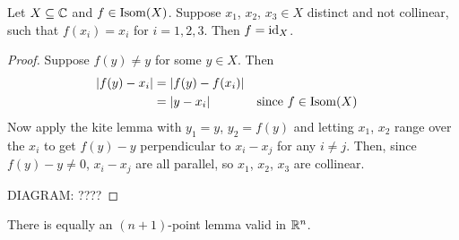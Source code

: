 \documentclass{../../template/note}
\begin{document}
    \begin{lemma}
        Let \(X \subseteq \mathbb C\) and \(f \in \operatorname{Isom}(X)\). Suppose \(x_1\), \(x_2\), \(x_3 \in X\) distinct and not collinear, such that \(f(x_i) = x_i\) for \(i=1,2,3\). Then \(f = \operatorname{id}_X\).
    \end{lemma}
    
    \begin{proof}
        Suppose \(f(y) \neq y\) for some \(y \in X\). Then
        \begin{align*}
            |f(y) - x_i| &= |f(y) - f(x_i)| \\
            &= |y - x_i| && \text{since } f \in \operatorname{Isom}(X)
        \end{align*}
        Now apply the kite lemma with \(y_1 = y\), \(y_2 = f(y)\) and letting \(x_1\), \(x_2\) range over the \(x_i\) to get \(f(y) - y\) perpendicular to \(x_i - x_j\) for any \(i \neq j\). Then, since \(f(y)-y \neq 0\),  \(x_i - x_j\) are all parallel, so \(x_1\), \(x_2\), \(x_3\) are collinear.

        DIAGRAM: ????
        
    \end{proof}
    
    \begin{remark*}
        There is equally an \((n+1)\)-point lemma valid in \(\mathbb R^n\).
    \end{remark*}
    
\end{document}
